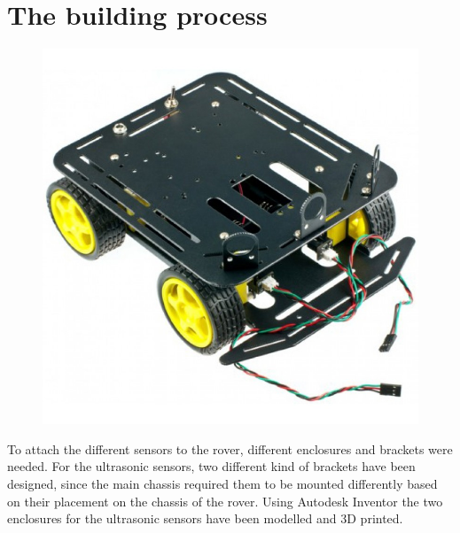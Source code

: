 \clearpage
\section{The building process}

\begin{figure}[H]
	\centering
	\includegraphics[width=.4\linewidth]{images/chassis.jpg}
\end{figure}

To attach the different sensors to the rover, different enclosures and brackets were needed. For the ultrasonic sensors, two different kind of brackets have been designed, since the main chassis required them to be mounted differently based on their placement on the chassis of the rover. Using Autodesk Inventor the two enclosures for the ultrasonic sensors have been modelled and 3D printed.

